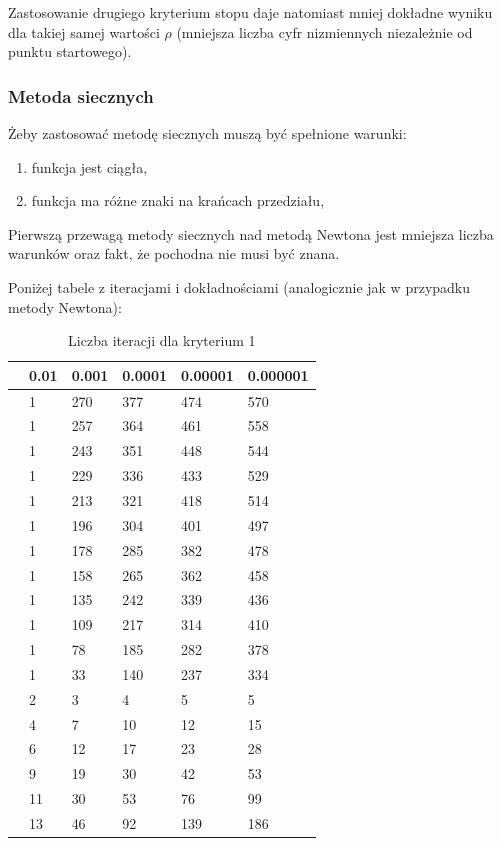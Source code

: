 \documentclass{article}
\begin{document}
Zastosowanie drugiego kryterium stopu daje natomiast mniej dokładne wyniku dla takiej samej wartości $\rho$
(mniejsza liczba cyfr nizmiennych niezależnie od punktu startowego).

\subsubsection{Metoda siecznych}
Żeby zastosować metodę siecznych muszą być spełnione warunki:
\begin{enumerate}
    \item
    funkcja jest ciągła,
    \item
    funkcja ma różne znaki na krańcach przedziału,
\end{enumerate}

Pierwszą przewagą metody siecznych nad metodą Newtona jest mniejsza liczba warunków oraz fakt, że pochodna nie musi być znana.

Poniżej tabele z iteracjami i dokładnościami (analogicznie jak w przypadku metody Newtona):

\begin{table}[H]
\centering
\begin{tabular}{|l|l|l|l|l|l|}
\hline
& 0.01 & 0.001 & 0.0001 & 0.00001 & 0.000001 \\ \hline
[0.10, 1.90] & 1 & 270 & 377 & 474 & 570 \\ \hline
[0.10, 1.80] & 1 & 257 & 364 & 461 & 558 \\ \hline
[0.10, 1.70] & 1 & 243 & 351 & 448 & 544 \\ \hline
[0.10, 1.60] & 1 & 229 & 336 & 433 & 529 \\ \hline
[0.10, 1.50] & 1 & 213 & 321 & 418 & 514 \\ \hline
[0.10, 1.40] & 1 & 196 & 304 & 401 & 497 \\ \hline
[0.10, 1.30] & 1 & 178 & 285 & 382 & 478 \\ \hline
[0.10, 1.20] & 1 & 158 & 265 & 362 & 458 \\ \hline
[0.10, 1.10] & 1 & 135 & 242 & 339 & 436 \\ \hline
[0.10, 1.00] & 1 & 109 & 217 & 314 & 410 \\ \hline
[0.10, 0.90] & 1 & 78 & 185 & 282 & 378 \\ \hline
[0.10, 0.80] & 1 & 33 & 140 & 237 & 334 \\ \hline
[0.10, 0.70] & 2 & 3 & 4 & 5 & 5 \\ \hline
[0.10, 0.60] & 4 & 7 & 10 & 12 & 15 \\ \hline
[0.10, 0.50] & 6 & 12 & 17 & 23 & 28 \\ \hline
[0.10, 0.40] & 9 & 19 & 30 & 42 & 53 \\ \hline
[0.10, 0.30] & 11 & 30 & 53 & 76 & 99 \\ \hline
[0.10, 0.20] & 13 & 46 & 92 & 139 & 186 \\ \hline
\end{tabular}
\caption{Liczba iteracji dla kryterium 1}
\end{table}
\end{document}
